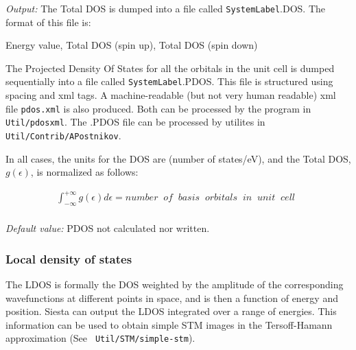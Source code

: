 \documentclass[11pt]{article}
\begin{document}
\begin{description}
{\it Output:} The Total DOS is dumped into a file
called {\tt SystemLabel}.DOS. The format of this file is:

Energy value, Total DOS (spin up), Total DOS (spin down)

The Projected Density Of States for all the orbitals in the unit cell
is dumped sequentially into a file called {\tt SystemLabel}.PDOS. This
file is structured using spacing and xml tags. A machine-readable (but
not very human readable) xml file {\tt pdos.xml} is also
produced. Both can be processed by the program in {\tt
  Util/pdosxml}. The .PDOS file can be processed by utilites in {\tt
  Util/Contrib/APostnikov}.

In all cases, the units for the DOS are (number of states/eV), and the
Total DOS, $g \left(\epsilon\right)$, is normalized as follows:

\begin{eqnarray}
   \int_{-\infty}^{+\infty} g \left(\epsilon\right) d\epsilon =
   number \;\; of \;\; basis \;\; orbitals \;\; in \;\;  unit \;\; cell \;\;
   \nonumber \\
\end{eqnarray}


{\it Default value:} PDOS not calculated nor written.
\end{description}


\subsubsection{Local density of states}

The LDOS is formally the DOS weighted by the amplitude of the
corresponding wavefunctions at different points in space, and is then
a function of energy and position. {\sc Siesta} can output the LDOS
integrated over a range of energies.  This information can be used to
obtain simple STM images in the Tersoff-Hamann approximation (See {\tt
  Util/STM/simple-stm}).
\end{document}
